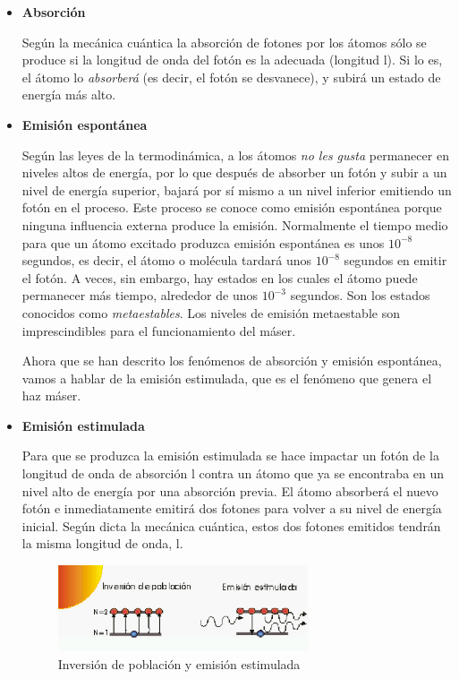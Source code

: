 \begin{itemize}
 \item \textbf{Absorci\'on}

Seg\'un la mec\'anica cu\'antica la absorci\'on de fotones por los \'atomos s\'olo se produce si la longitud de onda del fot\'on es la adecuada (longitud l). Si lo es, el \'atomo lo \textit{absorber\'a} (es decir, el fot\'on se desvanece), y subir\'a un estado de energ\'ia  m\'as alto.

 \item \textbf{Emisi\'on espont\'anea}

Seg\'un las leyes de la termodin\'amica, a los \'atomos \textit{no les gusta} permanecer en niveles altos de energ\'ia, por lo que despu\'es de absorber un fot\'on y subir a un nivel de energ\'ia superior, bajar\'a por s\'i mismo a un nivel inferior emitiendo un fot\'on en el proceso. Este proceso se conoce como emisi\'on espont\'anea porque ninguna influencia externa produce la emisi\'on. Normalmente el tiempo medio para que un \'atomo excitado produzca emisi\'on espont\'anea es unos $10^{-8}$ segundos, es decir, el \'atomo o mol\'ecula tardar\'a unos $10^{-8}$ segundos en emitir el fot\'on. A veces, sin embargo, hay estados en los cuales el \'atomo puede permanecer m\'as tiempo, alrededor de unos $10^{-3}$ segundos. Son los estados conocidos como \textit{metaestables}. Los niveles de emisi\'on metaestable son imprescindibles para el funcionamiento del m\'aser.

Ahora que se han descrito los fen\'omenos de absorci\'on y emisi\'on espont\'anea, vamos a hablar de la emisi\'on estimulada, que es el fen\'omeno que genera el haz m\'aser.

 \item \textbf{Emisi\'on estimulada}

Para que se produzca la emisi\'on estimulada se hace impactar un fot\'on de la longitud de onda de absorci\'on l contra un \'atomo que ya se encontraba en un nivel alto de energ\'ia por una absorci\'on previa. El \'atomo absorber\'a el nuevo fot\'on e inmediatamente emitir\'a dos fotones para volver a su nivel de energ\'ia inicial. Seg\'un dicta la mec\'anica cu\'antica, estos dos fotones emitidos tendr\'an la misma longitud de onda, l. 

\begin{figure}[htb!!]
 \centering
 \includegraphics[width=0.7\textwidth,keepaspectratio=true]{./Utils/emision_estimulada.png}
 \caption{Inversión de población y emisión estimulada}
 \label{fig:emision_estimulada}
\end{figure}


\end{itemize}
